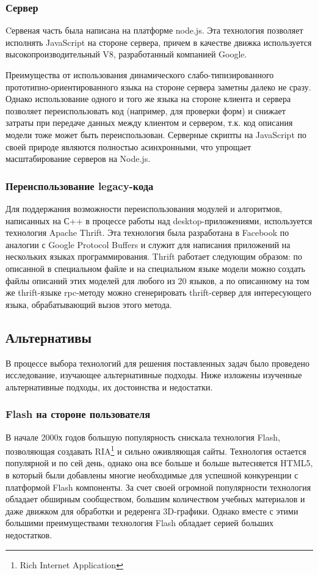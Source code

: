 \documentclass[12pt, a4paper]{article}
\begin{document}
\subsubsection{Сервер}
Cервеная часть была написана на платформе node.js. Эта технология позволяет
исполнять JavaScript на стороне сервера, причем в качестве движка используется
высокопроизводительный V8, разработанный компанией Google.

Преимущества от использования динамического слабо-типизированного
прототипно-ориентированного языка на стороне сервера заметны далеко не сразу.
Однако использование одного и того же языка на стороне клиента и сервера
позволяет переиспользовать код (например, для проверки форм) и снижает затраты
при передаче данных между клиентом и сервером, т.к. код описания модели тоже может
быть переиспользован. Серверные скрипты на JavaScript по своей природе являются
полностью асинхронными, что упрощает масштабирование серверов на Node.js.

\subsubsection{Переиспользование legacy-кода}
Для поддержания возможности переиспользования модулей и алгоритмов, написанных
на С++ в процессе работы над desktop-приложениями, используется технология
Apache Thrift. Эта технология была разработана в Facebook по аналогии с Google
Protocol Buffers и служит для написания приложений на нескольких языках
программирования. Thrift работает следующим образом: по описанной в специальном
файле и на специальном языке модели можно создать файлы описаний этих моделей
для любого из 20 языков, а по описанному на том же thrift-языке rpc-методу можно
сгенерировать thrift-сервер для интересующего языка, обрабатывающий вызов этого
метода.

\subsection{Альтернативы}
В процессе выбора технологий для решения поставленных задач было проведено исследование,
изучающее альтернативные подходы. Ниже изложены изученные альтернативные
подходы, их достоинства и недостатки.

\subsubsection{Flash на стороне пользователя}
В начале 2000х годов большую популярность снискала технология Flash,
позволяющая создавать RIA\footnote{Rich Internet Application} и
сильно оживляющая сайты. Технология остается популярной и по сей день,
однако она все больше и больше вытесняется HTML5, в который были добавлены
многие необходимые для успешной конкуренции с платформой Flash компоненты.
За счет своей огромной популярности технология обладает обширным сообществом,
большим количеством учебных материалов и даже движком для обработки и редеренга
3D-графики. Однако вместе с этими большими
преимуществами технология Flash обладает серией больших недостатков.
\end{document}
